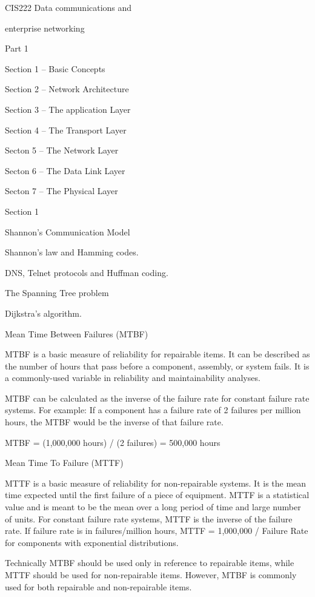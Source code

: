
CIS222 Data communications and

enterprise networking

 

Part 1

Section 1 – Basic Concepts

Section 2 – Network Architecture

Section 3 – The application Layer

Section 4 – The Transport Layer

Secton 5 – The Network Layer

Secton 6 – The Data Link Layer

Secton 7 – The Physical Layer

 

Section 1

Shannon’s Communication Model

Shannon’s law and Hamming codes.

DNS, Telnet protocols and Huffman coding.

The Spanning Tree problem

Dijkstra’s algorithm.

 

Mean Time Between Failures (MTBF)

MTBF is a basic measure of reliability for repairable items. It can be described as the number of hours that pass before a component, assembly, or system fails. It is a commonly-used variable in reliability and maintainability analyses.

MTBF can be calculated as the inverse of the failure rate for constant failure rate systems. For example: If a component has a failure rate of 2 failures per million hours, the MTBF would be the inverse of that failure rate.

MTBF = (1,000,000 hours) / (2 failures) = 500,000 hours

Mean Time To Failure (MTTF)

MTTF is a basic measure of reliability for non-repairable systems. It is the mean time expected until the first failure of a piece of equipment. MTTF is a statistical value and is meant to be the mean over a long period of time and large number of units. For constant failure rate systems, MTTF is the inverse of the failure rate. If failure rate is in failures/million hours, MTTF = 1,000,000 / Failure Rate for components with exponential distributions.

Technically MTBF should be used only in reference to repairable items, while MTTF should be used for non-repairable items. However, MTBF is commonly used for both repairable and non-repairable items.

 

